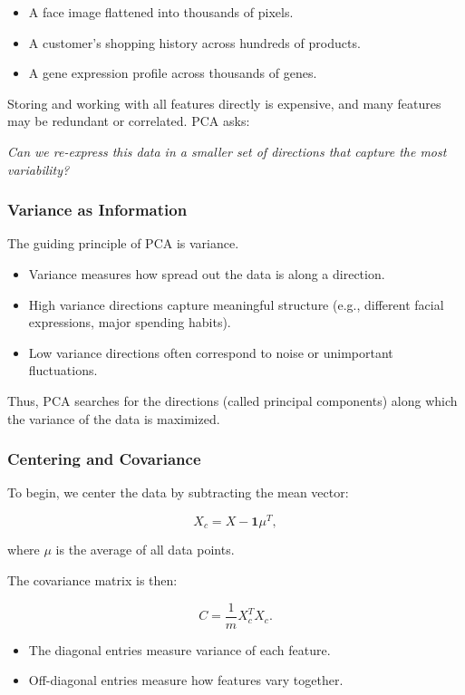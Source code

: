 \documentclass[
  letterpaper,
  DIV=11,
  numbers=noendperiod]{scrreprt}
\providecommand{\tightlist}{%
  \setlength{\itemsep}{0pt}\setlength{\parskip}{0pt}}
\begin{document}
\begin{itemize}
\tightlist
\item
  A face image flattened into thousands of pixels.
\item
  A customer's shopping history across hundreds of products.
\item
  A gene expression profile across thousands of genes.
\end{itemize}

Storing and working with all features directly is expensive, and many
features may be redundant or correlated. PCA asks:

\emph{Can we re-express this data in a smaller set of directions that
capture the most variability?}

\subsubsection{Variance as Information}\label{variance-as-information}

The guiding principle of PCA is variance.

\begin{itemize}
\tightlist
\item
  Variance measures how spread out the data is along a direction.
\item
  High variance directions capture meaningful structure (e.g., different
  facial expressions, major spending habits).
\item
  Low variance directions often correspond to noise or unimportant
  fluctuations.
\end{itemize}

Thus, PCA searches for the directions (called principal components)
along which the variance of the data is maximized.

\subsubsection{Centering and Covariance}\label{centering-and-covariance}

To begin, we center the data by subtracting the mean vector:

\[
X_c = X - \mathbf{1}\mu^T,
\]

where \(\mu\) is the average of all data points.

The covariance matrix is then:

\[
C = \frac{1}{m} X_c^T X_c.
\]

\begin{itemize}
\tightlist
\item
  The diagonal entries measure variance of each feature.
\item
  Off-diagonal entries measure how features vary together.
\end{itemize}
\end{document}
